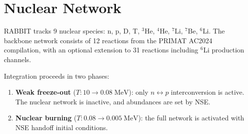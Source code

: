 \section{Nuclear Network}\label{sec:network}

RABBIT tracks 9 nuclear species: n, p, D, T, $^3$He, $^4$He, $^7$Li, $^7$Be, $^6$Li.  The backbone network consists of 12 reactions from the PRIMAT AC2024 compilation, with an optional extension to 31 reactions including $^6$Li production channels.

Integration proceeds in two phases:
\begin{enumerate}
\item \textbf{Weak freeze-out} ($T: 10 \to 0.08\;\mathrm{MeV}$): only $n \leftrightarrow p$ interconversion is active.  The nuclear network is inactive, and abundances are set by NSE.
\item \textbf{Nuclear burning} ($T: 0.08 \to 0.005\;\mathrm{MeV}$): the full network is activated with NSE handoff initial conditions.
\end{enumerate}

